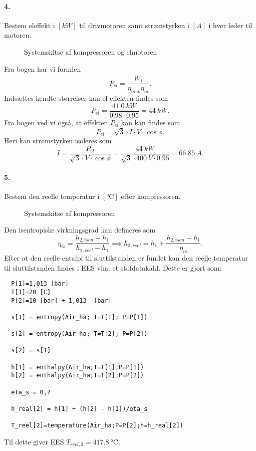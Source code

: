 \documentclass[a4paper]{article}
\begin{document}
\newpage
\paragraph{4.} Bestem eleffekt i $[\unit{kW}]$ til drivmotoren samt strømstyrken i $[\unit{A}]$ i hver leder til motoren.
\begin{figure}[ht]
    \centering
    \caption{Systemskitse af kompressoren og elmotoren}
\end{figure}
\bigbreak
Fra bogen har vi formlen
\[ 
  P_{el} = \frac{\dot{W}_i}{\eta_{mek} \eta_m}
.\]
Indsættes kendte størrelser kan el-effekten findes som
\[ 
P_{el} = \frac{\qty{41,0}{kW}}{\num{0,98} \cdot \num{0,95}} = \qty{44}{kW} 
.\]
Fra bogen ved vi også, at effekten $P_{el}$ kan kan findes som
\[ 
P_{el} = \sqrt{3}\cdot  I\cdot V\cdot \cos\phi
.\]
Heri kan strømstyrken isoleres som
\[ 
I = \frac{P_{el}}{\sqrt{3}\cdot V\cdot \cos\phi} = \frac{\qty{44}{kW}}{\sqrt{3}\cdot \qty{400}{V} \cdot \num{0,95}} = \qty{66,85}{A}
.\]


\paragraph{5.} Bestem den reelle temperatur i $[\unit{\celsius}]$ efter kompressoren.
\begin{figure}[ht]
    \centering
    \caption{Systemskitse af kompressoren}
\end{figure}
\bigbreak
Den isentropiske virkningsgrad kan defineres som
\[ 
\eta_{is} = \frac{h_{2, isen} - h_1}{h_{2, reel} - h_1} \implies h_{2, reel} = h_1 + \frac{h_{2, isen} - h_1}{\eta_{is}}
.\]
Efter at den reelle entalpi til sluttilstanden er fundet kan den reelle temperatur til sluttilstanden findes i EES vha. et stofdatakald. Dette er gjort som:
\begin{verbatim}
  P[1]=1,013 [bar]
  T[1]=20 [C]
  P[2]=10 [bar] + 1,013  [bar] 
 
  s[1] = entropy(Air_ha; T=T[1]; P=P[1])

  s[2] = entropy(Air_ha; T=T[2]; P=P[2])

  s[2] = s[1]

  h[1] = enthalpy(Air_ha;T=T[1];P=P[1])
  h[2] = enthalpy(Air_ha;T=T[2];P=P[2])

  eta_s = 0,7

  h_real[2] = h[1] + (h[2] - h[1])/eta_s

  T_reel[2]=temperature(Air_ha;P=P[2];h=h_real[2])
\end{verbatim}
Til dette giver EES $T_{reel,2} = \qty{417,8}{\celsius}$. 
\end{document}
